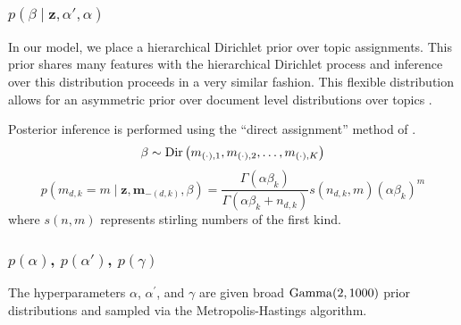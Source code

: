 \documentclass{article}
\begin{document}
%
%
%
%
%
%
%
%
\subsubsection{$p\left(\beta\mid\mathbf{z},\alpha',\alpha\right)$}
%
In our model, we place a hierarchical Dirichlet prior over topic assignments. This prior shares many features with the hierarchical Dirichlet process and inference over this distribution proceeds in a very similar fashion. This flexible distribution allows for an asymmetric prior over document level distributions over topics \citep{WallachMiMc2009}.

Posterior inference is performed using the {}``direct assignment'' method of \citet{TehJorBea2006}.
%
\begin{equation}
\beta\sim {\rm Dir}\left(m_{\left(\cdot\right),1},m_{\left(\cdot\right),2},\ldots,m_{\left(\cdot\right),K}\right)
\end{equation}
%
\begin{equation}
p\left(m_{d,k}=m\mid\mathbf{z},\mathbf{m}_{-\left(d,k\right)},\beta\right)=\frac{\Gamma\left(\alpha\beta_{k}\right)}{\Gamma\left(\alpha\beta_{k}+n_{d,k}\right)}s\left(n_{d,k},m\right)\left(\alpha\beta_{k}\right)^{m}
\end{equation}
%
%
where $s\left(n,m\right)$ represents stirling numbers of the first kind.
%
\subsubsection{$p\left(\alpha\right)$, $p\left(\alpha' \right)$, $p\left(\gamma \right)$}
%
The hyperparameters $\alpha$, $\alpha^\prime$, and $\gamma$ are given broad ${\rm Gamma}(2, 1000)$ prior distributions and sampled via the Metropolis-Hastings algorithm.
%
\end{document}
